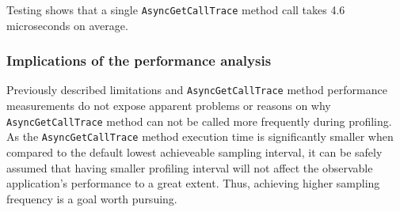 \documentclass[..thesis.tex]{subfiles}
\begin{document}
Testing shows that a single \texttt{AsyncGetCallTrace} method call takes 4.6 microseconds on average.

\subsubsection{Implications of the performance analysis}
Previously described limitations and \texttt{Async\-Get\-Call\-Trace} method performance measurements do not expose apparent problems or reasons on why \texttt{Async\-Get\-Call\-Trace} method can not be called more frequently during profiling. As the \texttt{Async\-Get\-Call\-Trace} method execution time is significantly smaller when compared to the default lowest achieveable sampling interval, it can be safely assumed that having smaller profiling interval will not affect the observable application's performance to a great extent. Thus, achieving higher sampling frequency is a goal worth pursuing.
\end{document}
